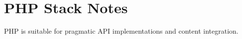 \section{PHP Stack Notes}

PHP is suitable for pragmatic API implementations and content integration.
